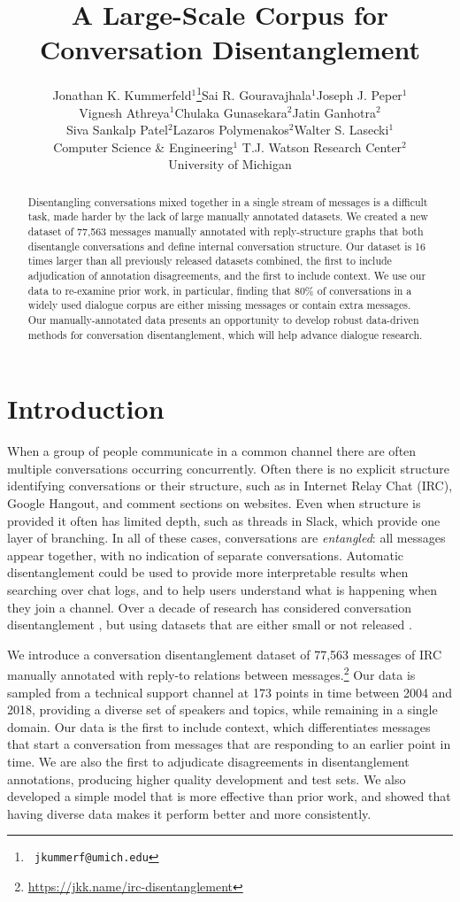 \documentclass[11pt,a4paper]{article}
\title{A Large-Scale Corpus for Conversation Disentanglement}
\author{
\begin{tabular}{ccc}
  Jonathan K. Kummerfeld$^1$\thanks{\tt \hspace{1mm} jkummerf@umich.edu} &
    Sai R. Gouravajhala$^1$ &
    Joseph J. Peper$^1$ \\
    Vignesh Athreya$^1$ &
    Chulaka Gunasekara$^2$ &
    Jatin Ganhotra$^2$ \\
    Siva Sankalp Patel$^2$ &
    Lazaros Polymenakos$^2$ &
    Walter S. Lasecki$^1$ \\[3pt]
  \multicolumn{3}{c}{
    \phantom{.} \hfill {\normalfont Computer Science \& Engineering$^1$} \hfill
  {\normalfont T.J. Watson Research Center$^2$} \hfill \phantom{.}
  } \\
  \multicolumn{3}{c}{
    \phantom{.} \hfill {\normalfont University of Michigan} \hfill
    \hspace{1cm}{\normalfont IBM Research AI} \hfill \phantom{.}
  } \\
\end{tabular}
}
\date{}
\makeatletter
\newcommand{\totaldata}{77,563\@\xspace}
\makeatother
\begin{document}
\maketitle

\begin{abstract}
    Disentangling conversations mixed together in a single stream of messages is a difficult task, made harder by the lack of large manually annotated datasets.
    We created a new dataset of \totaldata messages manually annotated with reply-structure graphs that both disentangle conversations and define internal conversation structure.
    Our dataset is 16 times larger than all previously released datasets combined, the first to include adjudication of annotation disagreements, and the first to include context.
    We use our data to re-examine prior work, in particular, finding that 80\% of conversations in a widely used dialogue corpus are either missing messages or contain extra messages.
    Our manually-annotated data presents an opportunity to develop robust data-driven methods for conversation disentanglement, which will help advance dialogue research.
\end{abstract}

\section{Introduction}

When a group of people communicate in a common channel there are often multiple conversations occurring concurrently.
Often there is no explicit structure identifying conversations or their structure, such as in Internet Relay Chat (IRC), Google Hangout, and comment sections on websites.
Even when structure is provided it often has limited depth, such as threads in Slack, which provide one layer of branching.
In all of these cases, conversations are \emph{entangled}: all messages appear together, with no indication of separate conversations.
Automatic disentanglement could be used to provide more interpretable results when searching over chat logs, and to help users understand what is happening when they join a channel.
Over a decade of research has considered conversation disentanglement \citep{Shen:2006}, but using datasets that are either small \citep[2,500 messages,][]{elsner:2008} or not released \citep{Adams:2008}.

We introduce a conversation disentanglement dataset of \totaldata messages of IRC manually annotated with reply-to relations between messages.\footnote{
  \url{https://jkk.name/irc-disentanglement}
}
Our data is sampled from a technical support channel at 173 points in time between 2004 and 2018, providing a diverse set of speakers and topics, while remaining in a single domain.
Our data is the first to include context, which differentiates messages that start a conversation from messages that are responding to an earlier point in time.
We are also the first to adjudicate disagreements in disentanglement annotations, producing higher quality development and test sets.
We also developed a simple model that is more effective than prior work, and showed that having diverse data makes it perform better and more consistently.
\end{document}
